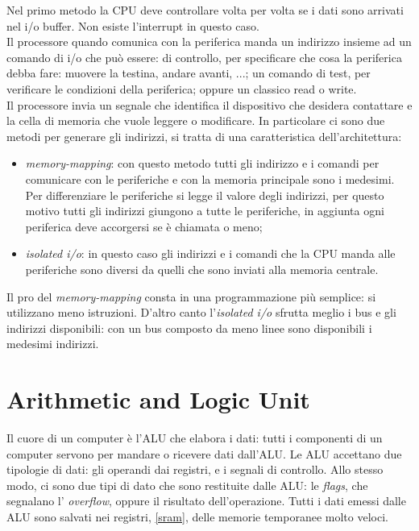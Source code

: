 \documentclass{article}
\begin{document}
Nel primo metodo la CPU deve controllare volta per volta se i dati sono arrivati nel i/o buffer. Non esiste l'interrupt in questo caso.\\
Il processore quando comunica con la periferica manda un indirizzo insieme ad un comando di i/o che può essere: di controllo, per specificare che cosa la periferica debba fare: muovere la testina, andare avanti, ...; un comando di test, per verificare le condizioni della periferica; oppure un classico read o write.\\
Il processore invia un segnale che identifica il dispositivo che desidera contattare e la cella di memoria che vuole leggere o modificare. In particolare ci sono due metodi per generare gli indirizzi, si tratta di una caratteristica dell'architettura:
\begin{itemize}
	\item \textit{memory-mapping}: con questo metodo tutti gli indirizzo e i comandi per comunicare con le periferiche e con la memoria principale sono i medesimi. Per differenziare le periferiche si legge il valore degli indirizzi, per questo motivo tutti gli indirizzi giungono a tutte le periferiche, in aggiunta ogni periferica deve accorgersi se è chiamata o meno;

	\item \textit{isolated i/o}: in questo caso gli indirizzi e i comandi che la CPU manda alle periferiche sono diversi da quelli che sono inviati alla memoria centrale.
\end{itemize}

Il pro del \textit{memory-mapping} consta in una programmazione più semplice: si utilizzano meno istruzioni. D'altro canto l'\textit{isolated i/o} sfrutta meglio i bus e gli indirizzi disponibili: con un bus composto da meno linee sono disponibili i medesimi indirizzi.


\section{Arithmetic and Logic Unit}
Il cuore di un computer è l'ALU che elabora i dati: tutti i componenti di un computer servono per mandare o ricevere dati dall'ALU. Le ALU accettano due tipologie di dati: gli operandi dai registri, e i segnali di controllo. Allo stesso modo, ci sono due tipi di dato che sono restituite dalle ALU: le \textit{flags}, che segnalano l' \textit{overflow}, oppure il risultato dell'operazione. Tutti i dati emessi dalle ALU sono salvati nei registri, \autoref{sram}, delle memorie temporanee molto veloci.
\end{document}

